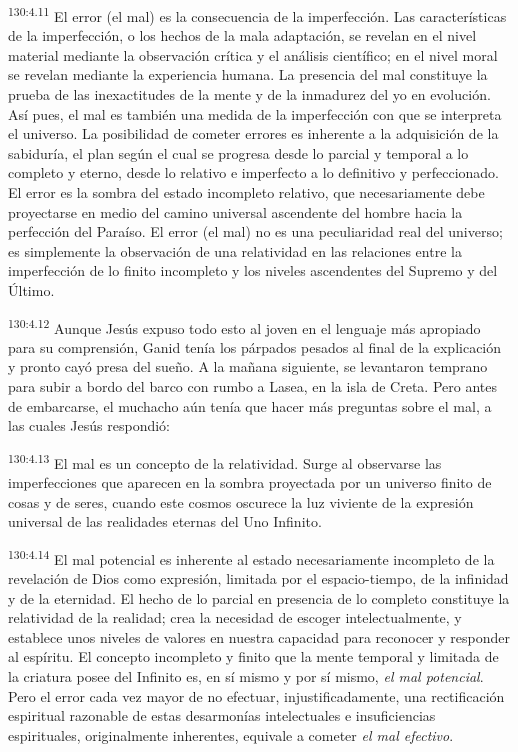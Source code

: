 \par 
\textsuperscript{130:4.11} El error (el mal) es la consecuencia de la imperfección. Las características de la imperfección, o los hechos de la mala adaptación, se revelan en el nivel material mediante la observación crítica y el análisis científico; en el nivel moral se revelan mediante la experiencia humana. La presencia del mal constituye la prueba de las inexactitudes de la mente y de la inmadurez del yo en evolución. Así pues, el mal es también una medida de la imperfección con que se interpreta el universo. La posibilidad de cometer errores es inherente a la adquisición de la sabiduría, el plan según el cual se progresa desde lo parcial y temporal a lo completo y eterno, desde lo relativo e imperfecto a lo definitivo y perfeccionado. El error es la sombra del estado incompleto relativo, que necesariamente debe proyectarse en medio del camino universal ascendente del hombre hacia la perfección del Paraíso. El error (el mal) no es una peculiaridad real del universo; es simplemente la observación de una relatividad en las relaciones entre la imperfección de lo finito incompleto y los niveles ascendentes del Supremo y del Último.

\par 
\textsuperscript{130:4.12} Aunque Jesús expuso todo esto al joven en el lenguaje más apropiado para su comprensión, Ganid tenía los párpados pesados al final de la explicación y pronto cayó presa del sueño. A la mañana siguiente, se levantaron temprano para subir a bordo del barco con rumbo a Lasea, en la isla de Creta. Pero antes de embarcarse, el muchacho aún tenía que hacer más preguntas sobre el mal, a las cuales Jesús respondió:

\par 
\textsuperscript{130:4.13} El mal es un concepto de la relatividad. Surge al observarse las imperfecciones que aparecen en la sombra proyectada por un universo finito de cosas y de seres, cuando este cosmos oscurece la luz viviente de la expresión universal de las realidades eternas del Uno Infinito.

\par 
\textsuperscript{130:4.14} El mal potencial es inherente al estado necesariamente incompleto de la revelación de Dios como expresión, limitada por el espacio-tiempo, de la infinidad y de la eternidad. El hecho de lo parcial en presencia de lo completo constituye la relatividad de la realidad; crea la necesidad de escoger intelectualmente, y establece unos niveles de valores en nuestra capacidad para reconocer y responder al espíritu. El concepto incompleto y finito que la mente temporal y limitada de la criatura posee del Infinito es, en sí mismo y por sí mismo, \textit{el mal potencial}. Pero el error cada vez mayor de no efectuar, injustificadamente, una rectificación espiritual razonable de estas desarmonías intelectuales e insuficiencias espirituales, originalmente inherentes, equivale a cometer \textit{el mal efectivo}.


